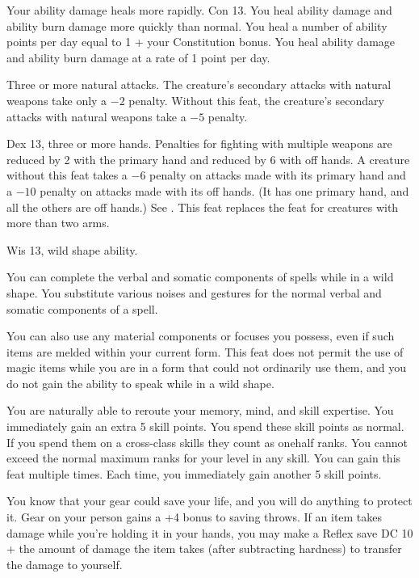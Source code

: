 {Your ability damage heals more rapidly.}
{Con 13.}
{You heal ability damage and ability burn damage more quickly than normal. You heal a number of ability points per day equal to 1 + your Constitution bonus.}
{You heal ability damage and ability burn damage at a rate of 1 point per day.}{}

{}
{Three or more natural attacks.}
{The creature's secondary attacks with natural weapons take only a $-2$ penalty.}
{Without this feat, the creature's secondary attacks with natural weapons take a $-5$ penalty.}
{}

{}
{Dex 13, three or more hands.}
{Penalties for fighting with multiple weapons are reduced by 2 with the primary hand and reduced by 6 with off hands.}
{A creature without this feat takes a $-6$ penalty on attacks made with its primary hand and a $-10$ penalty on attacks made with its off hands. (It has one primary hand, and all the others are off hands.) See .}
{This feat replaces the  feat for creatures with more than two arms.}

{Wis 13, wild shape ability.}
{You can complete the verbal and somatic components of spells while in a wild shape. You substitute various noises and gestures for the normal verbal and somatic components of a spell.

You can also use any material components or focuses you possess, even if such items are melded within your current form. This feat does not permit the use of magic items while you are in a form that could not ordinarily use them, and you do not gain the ability to speak while in a wild shape.}

{You are naturally able to reroute your memory, mind, and skill expertise.}{}
{You immediately gain an extra 5 skill points. You spend these skill points as normal. If you spend them on a cross-class skills they count as onehalf ranks. You cannot exceed the normal maximum ranks for your level in any skill.}{}
{You can gain this feat multiple times. Each time, you immediately gain another 5 skill points.}

{You know that your gear could save your life, and you will do anything to protect it.}{}
{Gear on your person gains a +4 bonus to saving throws. If an item takes damage while you're holding it in your hands, you may make a Reflex save DC 10 + the amount of damage the item takes (after subtracting hardness) to transfer the damage to yourself.}{}{}

